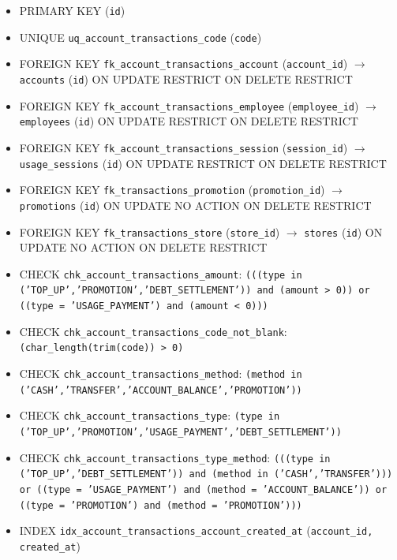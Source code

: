 \begin{itemize}

\item PRIMARY KEY (\texttt{id})

\item UNIQUE \texttt{uq\_account\_transactions\_code} (\texttt{code})

\item FOREIGN KEY \texttt{fk\_account\_transactions\_account} (\texttt{account\_id}) $\rightarrow$ \texttt{accounts} (\texttt{id}) ON UPDATE RESTRICT ON DELETE RESTRICT

\item FOREIGN KEY \texttt{fk\_account\_transactions\_employee} (\texttt{employee\_id}) $\rightarrow$ \texttt{employees} (\texttt{id}) ON UPDATE RESTRICT ON DELETE RESTRICT

\item FOREIGN KEY \texttt{fk\_account\_transactions\_session} (\texttt{session\_id}) $\rightarrow$ \texttt{usage\_sessions} (\texttt{id}) ON UPDATE RESTRICT ON DELETE RESTRICT

\item FOREIGN KEY \texttt{fk\_transactions\_promotion} (\texttt{promotion\_id}) $\rightarrow$ \texttt{promotions} (\texttt{id}) ON UPDATE NO ACTION ON DELETE RESTRICT

\item FOREIGN KEY \texttt{fk\_transactions\_store} (\texttt{store\_id}) $\rightarrow$ \texttt{stores} (\texttt{id}) ON UPDATE NO ACTION ON DELETE RESTRICT

\item CHECK \texttt{chk\_account\_transactions\_amount}: \texttt{(((type in ('TOP\_UP','PROMOTION','DEBT\_SETTLEMENT')) and (amount > 0)) or ((type = 'USAGE\_PAYMENT') and (amount < 0)))}

\item CHECK \texttt{chk\_account\_transactions\_code\_not\_blank}: \texttt{(char\_length(trim(code)) > 0)}

\item CHECK \texttt{chk\_account\_transactions\_method}: \texttt{(method in ('CASH','TRANSFER','ACCOUNT\_BALANCE','PROMOTION'))}

\item CHECK \texttt{chk\_account\_transactions\_type}: \texttt{(type in ('TOP\_UP','PROMOTION','USAGE\_PAYMENT','DEBT\_SETTLEMENT'))}

\item CHECK \texttt{chk\_account\_transactions\_type\_method}: \texttt{(((type in ('TOP\_UP','DEBT\_SETTLEMENT')) and (method in ('CASH','TRANSFER'))) or ((type = 'USAGE\_PAYMENT') and (method = 'ACCOUNT\_BALANCE')) or ((type = 'PROMOTION') and (method = 'PROMOTION')))}

\item INDEX \texttt{idx\_account\_transactions\_account\_created\_at} (\texttt{account\_id, created\_at})

\end{itemize}

